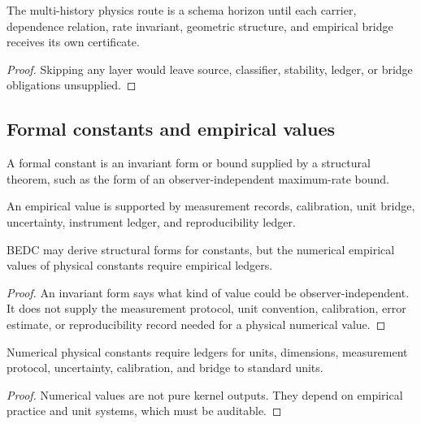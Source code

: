 \begin{corollary}
\label{cor:philosophy-physics-roadmap-not-proved-physics}
The multi-history physics route is a schema horizon until each carrier,
dependence relation, rate invariant, geometric structure, and empirical
bridge receives its own certificate.
\end{corollary}
\begin{proof}
Skipping any layer would leave source, classifier, stability, ledger,
or bridge obligations unsupplied.
\end{proof}

\subsection{Formal constants and empirical values}
\label{subsec:philosophy-formal-constants-empirical-values}

\begin{definition}
\label{def:philosophy-formal-constant}
A formal constant is an invariant form or bound supplied by a
structural theorem, such as the form of an observer-independent
maximum-rate bound.
\end{definition}

\begin{definition}
\label{def:philosophy-empirical-value}
An empirical value is supported by measurement records, calibration,
unit bridge, uncertainty, instrument ledger, and reproducibility
ledger.
\end{definition}

\begin{theorem}
\label{thm:philosophy-formal-constants-not-empirical-values}
BEDC may derive structural forms for constants, but the numerical
empirical values of physical constants require empirical ledgers.
\end{theorem}
\begin{proof}
An invariant form says what kind of value could be observer-independent.
It does not supply the measurement protocol, unit convention,
calibration, error estimate, or reproducibility record needed for a
physical numerical value.
\end{proof}

\begin{corollary}
\label{cor:philosophy-units-dimensions-ledgered}
Numerical physical constants require ledgers for units, dimensions,
measurement protocol, uncertainty, calibration, and bridge to standard
units.
\end{corollary}
\begin{proof}
Numerical values are not pure kernel outputs. They depend on empirical
practice and unit systems, which must be auditable.
\end{proof}

